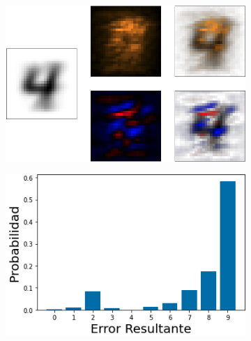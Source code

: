 \begin{figure}[h!]
    \centering
    \begin{subfigure}[b]{0.47\textwidth}
        \centering
        \includegraphics[width=\textwidth]{images/saliency/mnist/linear/4_saliency_figures.png}
        \caption{}
        \label{4_saliency}
    \end{subfigure}
    \hfill
    \begin{subfigure}[b]{0.47\textwidth}
        \centering
        \includegraphics[width=\textwidth]{images/saliency/mnist/linear/4_error.png}
        \caption{}
        \label{4_error}
    \end{subfigure}
    \caption{}
    \label{4_SAL}
\end{figure}


